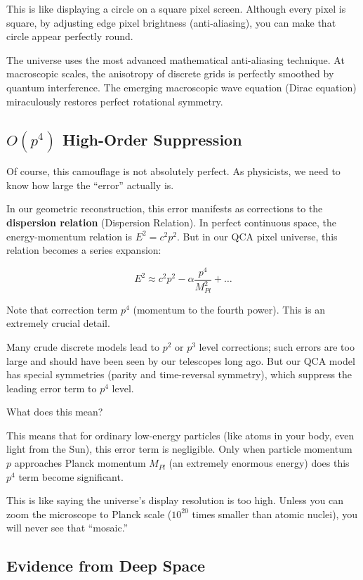 This is like displaying a circle on a square pixel screen. Although every pixel is square, by adjusting edge pixel brightness (anti-aliasing), you can make that circle appear perfectly round.

The universe uses the most advanced mathematical anti-aliasing technique. At macroscopic scales, the anisotropy of discrete grids is perfectly smoothed by quantum interference. The emerging macroscopic wave equation (Dirac equation) miraculously restores perfect rotational symmetry.

\subsection{$O(p^4)$ High-Order Suppression}

Of course, this camouflage is not absolutely perfect. As physicists, we need to know how large the ``error'' actually is.

In our geometric reconstruction, this error manifests as corrections to the \textbf{dispersion relation} (Dispersion Relation). In perfect continuous space, the energy-momentum relation is $E^2 = c^2p^2$. But in our QCA pixel universe, this relation becomes a series expansion:

$$E^2 \approx c^2p^2 - \alpha \frac{p^4}{M_{Pl}^2} + \dots$$

Note that correction term $p^4$ (momentum to the fourth power). This is an extremely crucial detail.

Many crude discrete models lead to $p^2$ or $p^3$ level corrections; such errors are too large and should have been seen by our telescopes long ago. But our QCA model has special symmetries (parity and time-reversal symmetry), which suppress the leading error term to $p^4$ level.

What does this mean?

This means that for ordinary low-energy particles (like atoms in your body, even light from the Sun), this error term is negligible. Only when particle momentum $p$ approaches Planck momentum $M_{Pl}$ (an extremely enormous energy) does this $p^4$ term become significant.

This is like saying the universe's display resolution is too high. Unless you can zoom the microscope to Planck scale ($10^{20}$ times smaller than atomic nuclei), you will never see that ``mosaic.''

\subsection{Evidence from Deep Space}

